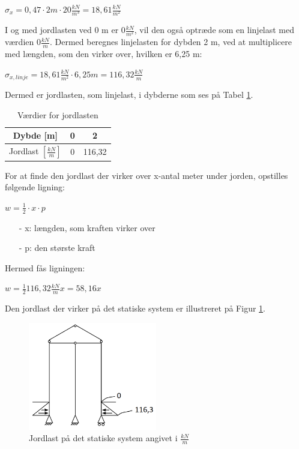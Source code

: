 \begin{center}
	$\sigma_x = 0,\!47\cdot 2 m\cdot 20 \frac{kN}{m^3} = 18,\!61 \frac{kN}{m^2}$
\end{center}

I og med jordlasten ved 0 m er $0 \frac{kN}{m^2}$, vil den også optræde som en linjelast med værdien $0 \frac{kN}{m}$. Dermed beregnes linjelasten for dybden 2 m, ved at multiplicere med længden, som den virker over, hvilken er 6,25 m:
\begin{center}
	$\sigma_{x,linje} = 18,\!61 \frac{kN}{m^2}\cdot 6,\!25 m = 116,\!32 \frac{kN}{m}$
\end{center}

Dermed er jordlasten, som linjelast, i dybderne som ses på Tabel \ref{tab:jord}.
\begin{table}[htb]
	\begin{center}
		\begin{tabular}{ |c|c|c| } 
		\hline
		Dybde [m] & 0 & 2 \\ \hline
		Jordlast $[\frac{kN}{m}]$ & 0 & 116,32 \\ \hline
		\end{tabular}
		\caption{Værdier for jordlasten}
		\label{tab:jord}
	\end{center}
\end{table}

For at finde den jordlast der virker over x-antal meter under jorden, opstilles følgende ligning:

\begin{center}
	$w = \frac{1}{2} \cdot x \cdot p$
\end{center}

\begin{itemize}
	\item[-] x: længden, som kraften virker over
	\item[-] p: den største kraft
\end{itemize}

Hermed fås ligningen: 
\begin{center}
	$w = \frac{1}{2} 116,\!32 \frac{kN}{m} x = 58,\!16x$
\end{center}

Den jordlast der virker på det statiske system er illustreret på Figur \ref{fig:jordlast}.

\begin{figure}[H]
	\centering
	\includegraphics[width=0.5\textwidth]{billeder/jordlast.png}
	\caption{Jordlast på det statiske system angivet i $\frac{kN}{m}$}
	\label{fig:jordlast}
\end{figure}


